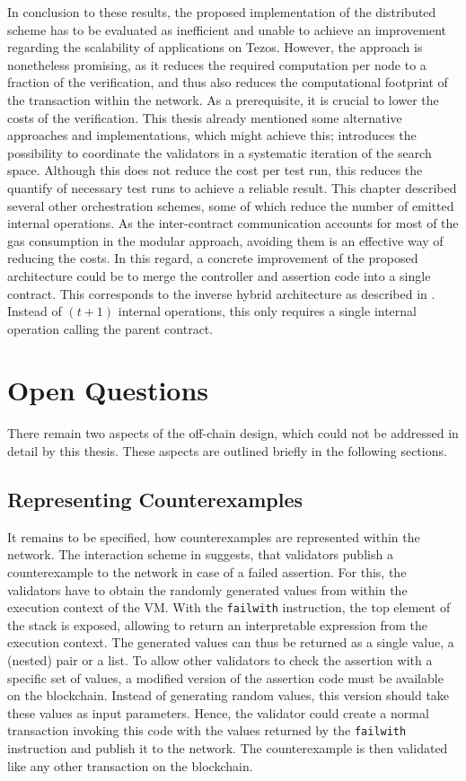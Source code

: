 In conclusion to these results, the proposed implementation of the distributed scheme has to be evaluated as inefficient and unable to achieve an improvement regarding the scalability of applications on Tezos. However, the approach is nonetheless promising, as it reduces the required computation per node to a fraction of the verification, and thus also reduces the computational footprint of the transaction within the network. As a prerequisite, it is crucial to lower the costs of the verification. This thesis already mentioned some alternative approaches and implementations, which might achieve this;  introduces the possibility to coordinate the validators in a systematic iteration of the search space. Although this does not reduce the cost per test run, this reduces the quantify of necessary test runs to achieve a reliable result. This chapter described several other orchestration schemes, some of which reduce the number of emitted internal operations. As the inter-contract communication accounts for most of the gas consumption in the modular approach, avoiding them is an effective way of reducing the costs. In this regard, a concrete improvement of the proposed architecture could be to merge the controller and assertion code into a single contract. This corresponds to the inverse hybrid architecture as described in . Instead of $(t+1)$ internal operations, this only requires a single internal operation calling the parent contract.

\section{Open Questions}
There remain two aspects of the off-chain design, which could not be addressed in detail by this thesis. These aspects are outlined briefly in the following sections.

\subsection{Representing Counterexamples}\label{sec:counterexample}
It remains to be specified, how counterexamples are represented within the network. The interaction scheme in  suggests, that validators publish a counterexample to the network in case of a failed assertion. For this, the validators have to obtain the randomly generated values from within the execution context of the VM. With the \texttt{failwith} instruction, the top element of the stack is exposed, allowing to return an interpretable expression from the execution context. The generated values can thus be returned as a single value, a (nested) pair or a list. To allow other validators to check the assertion with a specific set of values, a modified version of the assertion code must be available on the blockchain. Instead of generating random values, this version should take these values as input parameters. Hence, the validator could create a normal transaction invoking this code with the values returned by the \texttt{failwith} instruction and publish it to the network. The counterexample is then validated like any other transaction on the blockchain. 

